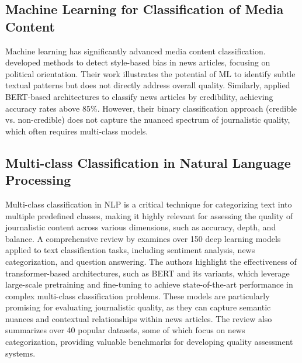 \subsection{Machine Learning for Classification of Media Content}

Machine learning has significantly advanced media content classification. \cite{potthast2018} developed methods to detect style-based bias in news articles, focusing on political orientation. Their work illustrates the potential of \ac{ML} to identify subtle textual patterns but does not directly address overall quality. Similarly, \cite{gonzalez2021} applied BERT-based architectures to classify news articles by credibility, achieving accuracy rates above 85\%. However, their binary classification approach (credible vs. non-credible) does not capture the nuanced spectrum of journalistic quality, which often requires multi-class models.



\subsection{Multi-class Classification in Natural Language Processing}

Multi-class classification in \ac{NLP} is a critical technique for categorizing text into multiple predefined classes, making it highly relevant for assessing the quality of journalistic content across various dimensions, such as accuracy, depth, and balance. A comprehensive review by \cite{minaee2020} examines over 150 deep learning models applied to text classification tasks, including sentiment analysis, news categorization, and question answering. The authors highlight the effectiveness of transformer-based architectures, such as BERT and its variants, which leverage large-scale pretraining and fine-tuning to achieve state-of-the-art performance in complex multi-class classification problems. These models are particularly promising for evaluating journalistic quality, as they can capture semantic nuances and contextual relationships within news articles. The review also summarizes over 40 popular datasets, some of which focus on news categorization, providing valuable benchmarks for developing quality assessment systems.

